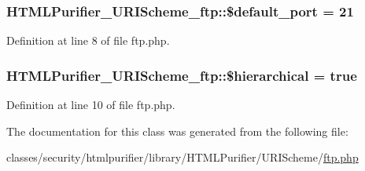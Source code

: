 \hypertarget{classHTMLPurifier__URIScheme__ftp_a48b8fe1052b83ee9c23987836f2e7d61}{
\subsubsection[{\$default\+\_\+port}]{\setlength{\rightskip}{0pt plus 5cm}H\+T\+M\+L\+Purifier\+\_\+\+U\+R\+I\+Scheme\+\_\+ftp\+::\$default\+\_\+port = 21}}\label{classHTMLPurifier__URIScheme__ftp_a48b8fe1052b83ee9c23987836f2e7d61}


Definition at line 8 of file ftp.\+php.

\hypertarget{classHTMLPurifier__URIScheme__ftp_aea2ab0dd4b2354db85c9d22608d149b3}{
\subsubsection[{\$hierarchical}]{\setlength{\rightskip}{0pt plus 5cm}H\+T\+M\+L\+Purifier\+\_\+\+U\+R\+I\+Scheme\+\_\+ftp\+::\$hierarchical = true}}\label{classHTMLPurifier__URIScheme__ftp_aea2ab0dd4b2354db85c9d22608d149b3}


Definition at line 10 of file ftp.\+php.



The documentation for this class was generated from the following file\+:\begin{DoxyCompactItemize}
\item 
classes/security/htmlpurifier/library/\+H\+T\+M\+L\+Purifier/\+U\+R\+I\+Scheme/\hyperlink{ftp_8php}{ftp.\+php}\end{DoxyCompactItemize}
